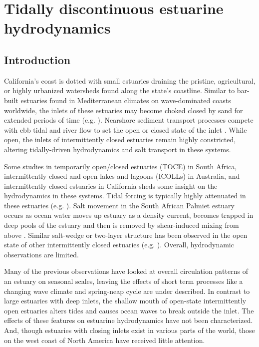 \chapter{Tidally discontinuous estuarine hydrodynamics}
\label{ch3}




\section{Introduction}

California's coast is dotted with small estuaries draining the pristine,
agricultural, or highly urbanized watersheds found along the state's
coastline. Similar to bar-built estuaries found in Mediterranean climates
on wave-dominated coasts worldwide, the inlets of these estuaries
may become choked closed by sand for extended periods of time (e.g.
\cite{elwany_opening_1998,hanes_waves_2011,fortunato_morphological_2014,ranasinghe_seasonal_2003}).
Nearshore sediment transport processes compete with ebb tidal and
river flow to set the open or closed state of the inlet \parencite{behrens_episodic_2013}.
While open, the inlets of intermittently closed estuaries remain highly
constricted, altering tidally-driven hydrodynamics and salt transport
in these systems.

Some studies in temporarily open/closed estuaries (TOCE) in South
Africa, intermittently closed and open lakes and lagoons (ICOLLs)
in Australia, and intermittently closed estuaries in California sheds
some insight on the hydrodynamics in these systems. Tidal forcing
is typically highly attenuated in these estuaries (e.g. \cite{ranasinghe_circulation_1999,gale_processes_2007}).
Salt movement in the South African Palmiet estuary occurs as ocean
water moves up estuary as a density current, becomes trapped in deep
pools of the estuary and then is removed by shear-induced mixing from
above \parencite{largier_dynamics_1991}. Similar salt-wedge or two-layer
structure has been observed in the open state of other intermittently
closed estuaries (e.g. \cite{sharples_quantifying_2003}). Overall,
hydrodynamic observations are limited.

Many of the previous observations have looked at overall circulation
patterns of an estuary on seasonal scales, leaving the effects of
short term processes like a changing wave climate and spring-neap
cycle are under described. In contrast to large estuaries with deep
inlets, the shallow mouth of open-state intermittently open estuaries
alters tides and causes ocean waves to break outside the inlet. The
effects of these features on estuarine hydrodynamics have not been
characterized. And, though estuaries with closing inlets exist in
various parts of the world, those on the west coast of North America
have received little attention. 

